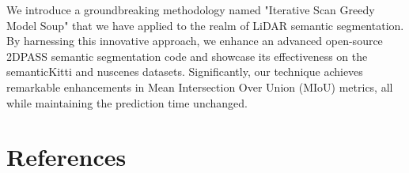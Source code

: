 \documentclass[10pt,twocolumn,letterpaper]{article}
\begin{document}
We introduce a groundbreaking methodology named "Iterative Scan Greedy Model Soup" that we have applied to the realm of LiDAR semantic segmentation. By harnessing this innovative approach, we enhance an advanced open-source 2DPASS \cite{yan20222dpass} semantic segmentation code and showcase its effectiveness on the semanticKitti and nuscenes datasets. Significantly, our technique achieves remarkable enhancements in Mean Intersection Over Union (MIoU) metrics, all while maintaining the prediction time unchanged.


\section{References}


\end{document}
